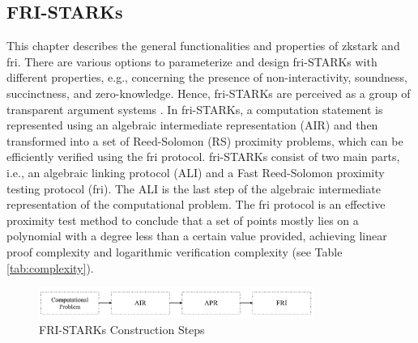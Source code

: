 \subsection{FRI-STARKs}
This chapter describes the general functionalities and properties of \acrshort{zkstark} and \acrshort{fri}. There are various options to parameterize and design \acrshort{fri}-STARKs with different properties, e.g., concerning the presence of non-interactivity, soundness, succinctness, and zero-knowledge. Hence, \acrshort{fri}-STARKs are perceived as a group of transparent argument systems \citep{zkstark}. In \acrshort{fri}-STARKs, a computation statement is represented using an algebraic intermediate representation (AIR) and then transformed into a set of Reed-Solomon (RS) proximity problems, which can be efficiently verified using the \acrshort{fri} protocol. \acrshort{fri}-STARKs consist of two main parts, i.e., an algebraic linking protocol (ALI) and a Fast Reed-Solomon proximity testing protocol (\acrshort{fri}). The ALI is the last step of the algebraic intermediate representation of the computational problem. The \acrshort{fri} protocol is an effective proximity test method to conclude that a set of points mostly lies on a polynomial with a degree less than a certain value provided, achieving linear proof complexity and logarithmic verification complexity (see Table \ref{tab:complexity}). 
\begin{figure}[hbt]
	\centering
	\includegraphics[width=0.8\textwidth]{Pictures/zkstark.png}
	\caption{FRI-STARKs Construction Steps}
	\label{fig:fristark}
\end{figure}
